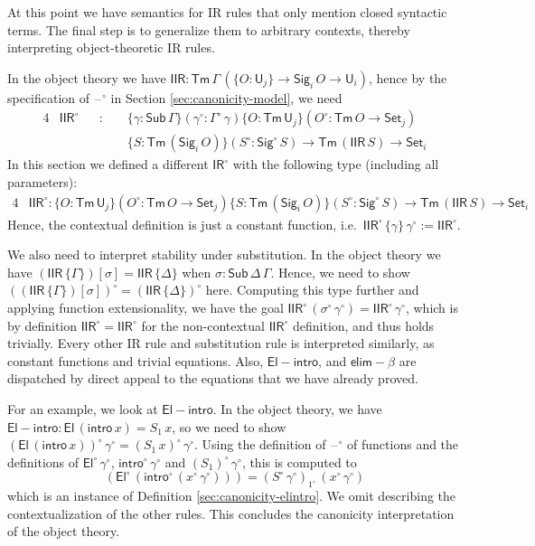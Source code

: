 \documentclass[acmsmall,screen,review,anonymous]{acmart}
\newcommand{\msf}[1]{{\mathsf{#1}}}
\newcommand{\U}{\msf{U}}
\newcommand{\Set}{\msf{Set}}
\newcommand{\El}{\msf{El}}
\newcommand{\Sig}{\msf{Sig}}
\newcommand{\blank}{{\mathord{\hspace{1pt}\text{--}\hspace{1pt}}}}
\newcommand{\IR}{\msf{IR}}
\newcommand{\intro}{\msf{intro}}
\newcommand{\elim}{\msf{elim}}
\newcommand{\IIR}{\msf{IIR}}
\newcommand{\Sub}{\msf{Sub}}
\newcommand{\Tm}{\msf{Tm}}
\newcommand{\w}{\circ}
\newcommand{\Elintro}{\msf{El\!\!-\!\!intro}}
\newcommand{\elimbeta}{\elim\!-\!\!\beta}
\begin{document}
\begin{definition}
At this point we have semantics for IR rules that only mention closed syntactic terms. The final
step is to generalize them to arbitrary contexts, thereby interpreting object-theoretic IR rules.

In the object theory we have $\IIR : \Tm\,\Gamma\,(\{O : \U_j\} \to \Sig_i\,O \to \U_i)$, hence by the specification
of $\blank^\w$ in Section \ref{sec:canonicity-model}, we need
\begin{alignat*}{4}
  & \IIR^\w &&:\,\,&& \{\gamma : \Sub\,\Gamma\}(\gamma^\w : \Gamma^\w\,\gamma)\{O : \Tm\,\U_j\}(O^\w : \Tm\,O \to \Set_j)\\
  &         &&     && \{S : \Tm\,(\Sig_i\,O)\}(S^\w : \Sig^\w\,S) \to \Tm\,(\IIR\,S) \to \Set_i
\end{alignat*}
In this section we defined a different $\IR^\w$ with the following type (including all parameters):
\begin{alignat*}{4}
  & \IIR^\w : \{O : \Tm\,\U_j\}(O^\w : \Tm\,O \to \Set_j)\{S : \Tm\,(\Sig_i\,O)\}(S^\w : \Sig^\w\,S) \to \Tm\,(\IIR\,S) \to \Set_i
\end{alignat*}
Hence, the contextual definition is just a constant function, i.e.\ $\IIR^\w\,\{\gamma\}\,\gamma^\w
:= \IIR^\w$.

We also need to interpret stability under substitution. In the object theory we have
$(\IIR\,\{\Gamma\})[\sigma] = \IIR\,\{\Delta\}$ when $\sigma : \Sub\,\Delta\,\Gamma$. Hence, we need
to show $((\IIR\,\{\Gamma\})[\sigma])^\w = (\IIR\,\{\Delta\})^\w$ here. Computing this type further
and applying function extensionality, we have the goal $\IIR^\w\,(\sigma^\w\,\gamma^\w) =
\IIR^\w\,\gamma^\w$, which is by definition $\IIR^\w = \IIR^\w$ for the non-contextual $\IIR^\w$
definition, and thus holds trivially. Every other IR rule and substitution rule is interpreted
similarly, as constant functions and trivial equations. Also, $\Elintro$, and $\elimbeta$ are
dispatched by direct appeal to the equations that we have already proved.

For an example, we look at $\Elintro$. In the object theory, we have $\Elintro : \El\,(\intro\,x) =
S_1\,x$, so we need to show $(\El\,(\intro\,x))^\w\,\gamma^\w = (S_1\,x)^\w\,\gamma^\w$. Using the
definition of $\blank^\w$ of functions and the definitions of $\El^\w\,\gamma^\w$,
$\intro^\w\,\gamma^\w$ and $(S_1)^\w\,\gamma^\w$, this is computed to
\[ (\El^\w\,(\intro^\w\,(x^\w\,\gamma^\w))) = (S^\w\,\gamma^\w)_{1^\w}\,(x^\w\,\gamma^\w) \]
which is an instance of Definition \ref{sec:canonicity-elintro}. We omit describing the contextualization of
the other rules. This concludes the canonicity interpretation of the object theory.

\end{definition}
\end{document}
